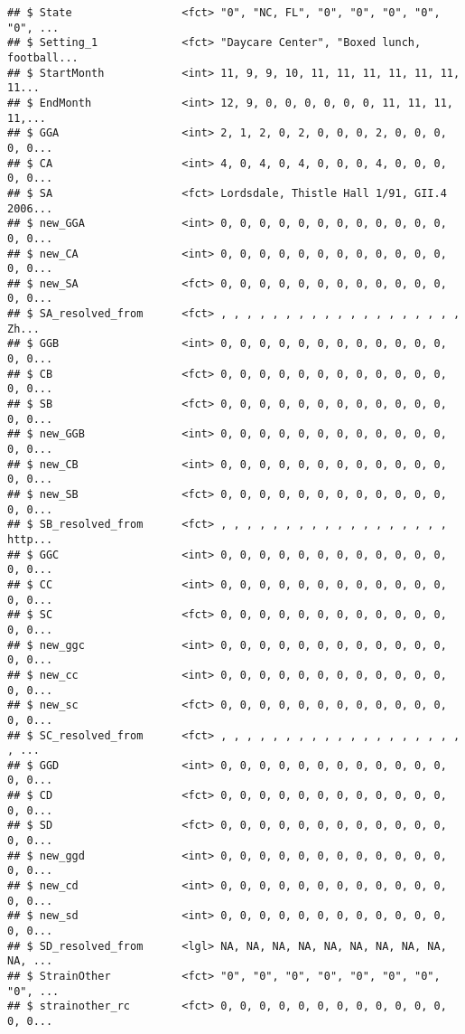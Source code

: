 \documentclass[]{article}
\begin{document}
\begin{verbatim}
## $ State                 <fct> "0", "NC, FL", "0", "0", "0", "0", "0", ...
## $ Setting_1             <fct> "Daycare Center", "Boxed lunch, football...
## $ StartMonth            <int> 11, 9, 9, 10, 11, 11, 11, 11, 11, 11, 11...
## $ EndMonth              <int> 12, 9, 0, 0, 0, 0, 0, 0, 11, 11, 11, 11,...
## $ GGA                   <int> 2, 1, 2, 0, 2, 0, 0, 0, 2, 0, 0, 0, 0, 0...
## $ CA                    <int> 4, 0, 4, 0, 4, 0, 0, 0, 4, 0, 0, 0, 0, 0...
## $ SA                    <fct> Lordsdale, Thistle Hall 1/91, GII.4 2006...
## $ new_GGA               <int> 0, 0, 0, 0, 0, 0, 0, 0, 0, 0, 0, 0, 0, 0...
## $ new_CA                <int> 0, 0, 0, 0, 0, 0, 0, 0, 0, 0, 0, 0, 0, 0...
## $ new_SA                <fct> 0, 0, 0, 0, 0, 0, 0, 0, 0, 0, 0, 0, 0, 0...
## $ SA_resolved_from      <fct> , , , , , , , , , , , , , , , , , , , Zh...
## $ GGB                   <int> 0, 0, 0, 0, 0, 0, 0, 0, 0, 0, 0, 0, 0, 0...
## $ CB                    <fct> 0, 0, 0, 0, 0, 0, 0, 0, 0, 0, 0, 0, 0, 0...
## $ SB                    <fct> 0, 0, 0, 0, 0, 0, 0, 0, 0, 0, 0, 0, 0, 0...
## $ new_GGB               <int> 0, 0, 0, 0, 0, 0, 0, 0, 0, 0, 0, 0, 0, 0...
## $ new_CB                <int> 0, 0, 0, 0, 0, 0, 0, 0, 0, 0, 0, 0, 0, 0...
## $ new_SB                <fct> 0, 0, 0, 0, 0, 0, 0, 0, 0, 0, 0, 0, 0, 0...
## $ SB_resolved_from      <fct> , , , , , , , , , , , , , , , , , , http...
## $ GGC                   <int> 0, 0, 0, 0, 0, 0, 0, 0, 0, 0, 0, 0, 0, 0...
## $ CC                    <int> 0, 0, 0, 0, 0, 0, 0, 0, 0, 0, 0, 0, 0, 0...
## $ SC                    <fct> 0, 0, 0, 0, 0, 0, 0, 0, 0, 0, 0, 0, 0, 0...
## $ new_ggc               <int> 0, 0, 0, 0, 0, 0, 0, 0, 0, 0, 0, 0, 0, 0...
## $ new_cc                <int> 0, 0, 0, 0, 0, 0, 0, 0, 0, 0, 0, 0, 0, 0...
## $ new_sc                <fct> 0, 0, 0, 0, 0, 0, 0, 0, 0, 0, 0, 0, 0, 0...
## $ SC_resolved_from      <fct> , , , , , , , , , , , , , , , , , , , , ...
## $ GGD                   <int> 0, 0, 0, 0, 0, 0, 0, 0, 0, 0, 0, 0, 0, 0...
## $ CD                    <fct> 0, 0, 0, 0, 0, 0, 0, 0, 0, 0, 0, 0, 0, 0...
## $ SD                    <fct> 0, 0, 0, 0, 0, 0, 0, 0, 0, 0, 0, 0, 0, 0...
## $ new_ggd               <int> 0, 0, 0, 0, 0, 0, 0, 0, 0, 0, 0, 0, 0, 0...
## $ new_cd                <int> 0, 0, 0, 0, 0, 0, 0, 0, 0, 0, 0, 0, 0, 0...
## $ new_sd                <int> 0, 0, 0, 0, 0, 0, 0, 0, 0, 0, 0, 0, 0, 0...
## $ SD_resolved_from      <lgl> NA, NA, NA, NA, NA, NA, NA, NA, NA, NA, ...
## $ StrainOther           <fct> "0", "0", "0", "0", "0", "0", "0", "0", ...
## $ strainother_rc        <fct> 0, 0, 0, 0, 0, 0, 0, 0, 0, 0, 0, 0, 0, 0...

\end{verbatim}
\end{document}
